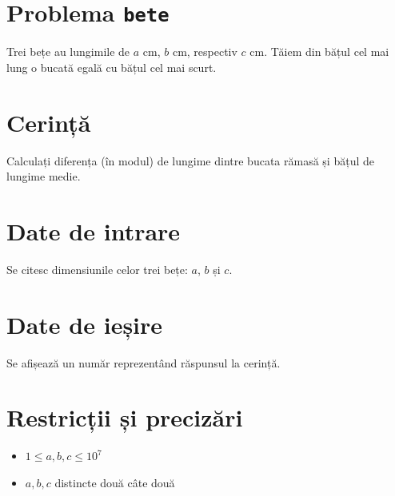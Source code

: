 \documentclass{scrartcl}
\author{Test Tutors of CNMB Informatică}
\date{17 februarie 2024}
\begin{document}
\section*{Problema \texttt{bete}}
Trei bețe au lungimile de $a$ cm, $b$ cm, respectiv $c$ cm. Tăiem din bățul cel mai lung o bucată egală cu bățul cel mai scurt. 
\section*{Cerință}
Calculați diferența (în modul) de lungime dintre bucata rămasă și bățul de lungime medie.
\section*{Date de intrare}
Se citesc dimensiunile celor trei bețe: $a$, $b$ și $c$.
\section*{Date de ieșire}
Se afișează un număr reprezentând răspunsul la cerință.
\section*{Restricții și precizări}
\begin{itemize}
    \item $1 \leq a, b, c \leq 10^7$
    \item $a, b, c$ distincte două câte două
\end{itemize}
\end{document}
